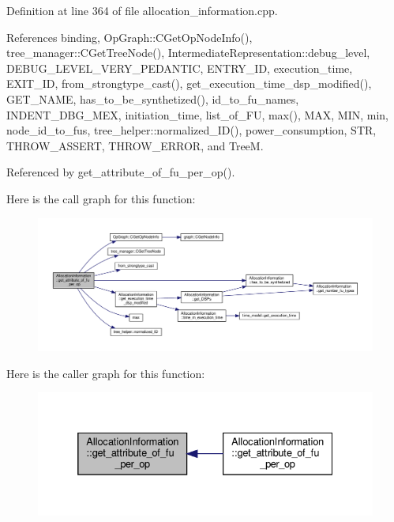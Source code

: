 Definition at line 364 of file allocation\+\_\+information.\+cpp.



References binding, Op\+Graph\+::\+C\+Get\+Op\+Node\+Info(), tree\+\_\+manager\+::\+C\+Get\+Tree\+Node(), Intermediate\+Representation\+::debug\+\_\+level, D\+E\+B\+U\+G\+\_\+\+L\+E\+V\+E\+L\+\_\+\+V\+E\+R\+Y\+\_\+\+P\+E\+D\+A\+N\+T\+IC, E\+N\+T\+R\+Y\+\_\+\+ID, execution\+\_\+time, E\+X\+I\+T\+\_\+\+ID, from\+\_\+strongtype\+\_\+cast(), get\+\_\+execution\+\_\+time\+\_\+dsp\+\_\+modified(), G\+E\+T\+\_\+\+N\+A\+ME, has\+\_\+to\+\_\+be\+\_\+synthetized(), id\+\_\+to\+\_\+fu\+\_\+names, I\+N\+D\+E\+N\+T\+\_\+\+D\+B\+G\+\_\+\+M\+EX, initiation\+\_\+time, list\+\_\+of\+\_\+\+FU, max(), M\+AX, M\+IN, min, node\+\_\+id\+\_\+to\+\_\+fus, tree\+\_\+helper\+::normalized\+\_\+\+I\+D(), power\+\_\+consumption, S\+TR, T\+H\+R\+O\+W\+\_\+\+A\+S\+S\+E\+RT, T\+H\+R\+O\+W\+\_\+\+E\+R\+R\+OR, and TreeM.



Referenced by get\+\_\+attribute\+\_\+of\+\_\+fu\+\_\+per\+\_\+op().

Here is the call graph for this function\+:
\nopagebreak
\begin{figure}[H]
\begin{center}
\leavevmode
\includegraphics[width=350pt]{d7/d79/classAllocationInformation_ae46c25c700c15eb6ba2505f6527ca6f1_cgraph}
\end{center}
\end{figure}
Here is the caller graph for this function\+:
\nopagebreak
\begin{figure}[H]
\begin{center}
\leavevmode
\includegraphics[width=332pt]{d7/d79/classAllocationInformation_ae46c25c700c15eb6ba2505f6527ca6f1_icgraph}
\end{center}
\end{figure}
\mbox{\label{classAllocationInformation_af971b67971b944136aaef74398f7e90d}} 
